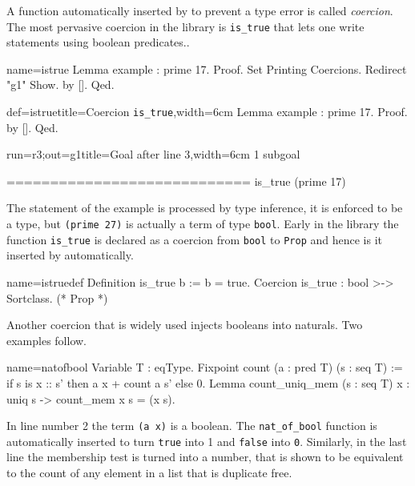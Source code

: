 A function automatically inserted by \Coq{} to prevent a type
error is called \emph{coercion}.
The most pervasive coercion in the \mcbMC{} library is
\lstinline/is_true/ that lets one write statements using boolean
predicates..

\begin{coqdef}{name=istrue}
Lemma example : prime 17.
Proof.
Set Printing Coercions. Redirect "g1" Show.
by [].
Qed.
\end{coqdef}
\begin{coq}{def=istrue}{title=Coercion \lstinline/is_true/,width=6cm}
Lemma example : prime 17.
Proof.  by [].  Qed.
\end{coq}
\begin{coqout}{run=r3;out=g1}{title=Goal after line 3,width=6cm}
1 subgoal

============================
is_true (prime 17)
\end{coqout}

The statement of the example is processed by type inference,
it is enforced to be a type, but \lstinline/(prime 27)/ is actually
a term of type \lstinline/bool/.  Early in the library the
function \lstinline/is_true/ is declared as a coercion from
\lstinline/bool/ to \lstinline/Prop/ and hence is it inserted
by \Coq{} automatically.

\begin{coq}{name=istruedef}{}
Definition is_true b := b = true.
Coercion is_true : bool >-> Sortclass. (* Prop *)
\end{coq}

Another coercion that is widely used injects booleans into naturals.
Two examples follow.

\begin{coq}{name=natofbool}{}
Variable T : eqType.
Fixpoint count (a : pred T) (s : seq T) :=
  if s is x :: s' then a x + count a s' else 0.
Lemma count_uniq_mem (s : seq T) x :
  uniq s -> count_mem x s = (x \in s).
\end{coq}

In line number 2 the term \lstinline/(a x)/ is a boolean.  The
\lstinline/nat_of_bool/ function is automatically inserted to turn
\lstinline/true/ into 1 and \lstinline/false/ into \lstinline/0/.
Similarly, in the last line the membership test is turned into
a number, that is shown to be equivalent to the count of any
element in a list that is duplicate free.

